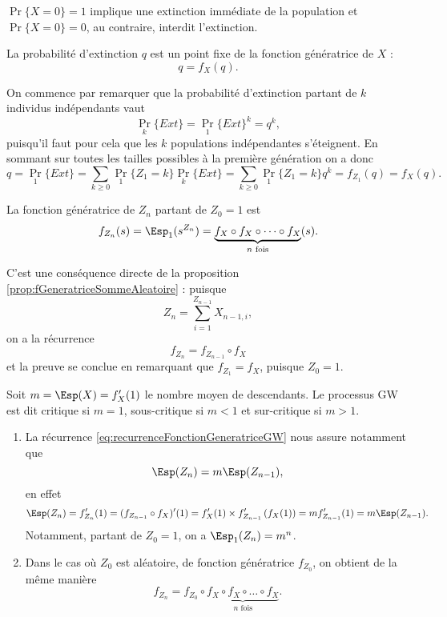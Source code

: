 \remark
$\Pr\{X = 0\} = 1$ implique une extinction immédiate de la population et $\Pr\{X = 0\} = 0$, au contraire, interdit l'extinction.

\begin{proposition}
  La probabilité d'extinction $q$ est un point fixe de la fonction génératrice de $X$ :
  $$
  q = f_X(q).
  $$
\end{proposition}

\proof
On commence par remarquer que la probabilité d'extinction partant de $k$ individus indépendants vaut
$$
\Pr_k\{Ext\} = \Pr_1\{Ext\}^k = q^k,
$$
puisqu'il faut pour cela que les $k$ populations indépendantes s'éteignent. En sommant sur toutes les tailles possibles à la première génération on a donc
$$
q 
= \Pr_1\{Ext\} 
= \sum_{k \geq 0} \Pr_1\{Z_1 = k\} \Pr_k\{Ext\}
= \sum_{k \geq 0} \Pr_1\{Z_1 = k\} q^k
= f_{Z_1}(q)
= f_X(q).
$$

\begin{proposition} \label{prop:fonctionGeneratriceZn}
  La fonction génératrice de $Z_n$ partant de $Z_0 = 1$ est
  $$
  f_{Z_n}(s) = \Esp_1(s^{Z_n}) = \underset{n \text{ fois}}{\underbrace{f_X \circ f_X \circ \dots \circ f_X}}(s).
  $$
\end{proposition}

\proof 
C'est une conséquence directe de la proposition \ref{prop:fGeneratriceSommeAleatoire} : puisque
$$
Z_n = \sum_{i=1}^{Z_{n-1}} X_{n-1, i},
$$
on a la récurrence 
\begin{equation} \label{eq:recurrenceFonctionGeneratriceGW}
f_{Z_n} = f_{Z_{n-1}} \circ f_X
\end{equation}
et la preuve se conclue en remarquant que $f_{Z_1} = f_X$, puisque $Z_0 = 1$.
\eproof

\begin{definition}
  Soit $m = \Esp(X) = f'_X(1)$ le nombre moyen de descendants. Le processus GW est dit critique si $m=1$, sous-critique si $m < 1$ et sur-critique si $m > 1$.
\end{definition}

\remarks
\begin{enumerate}
  \item La récurrence \eqref{eq:recurrenceFonctionGeneratriceGW} nous assure notamment que
  $$
  \Esp(Z_n) = m \Esp(Z_{n-1}),
  $$
  en effet
  \begin{align*}
    \Esp(Z_n) 
    = f'_{Z_n}(1) = (f_{Z_{n-1}} \circ f_X)'(1) 
    = f'_X(1) \times f'_{Z_{n-1}}\left(f_X(1)\right) 
    = m f'_{Z_{n-1}}(1) = m \Esp(Z_{n-1}).
  \end{align*}
  Notamment, partant de $Z_0 = 1$, on a $\Esp_1(Z_n) = m^n$.
  \item Dans le cas où $Z_0$ est aléatoire, de fonction génératrice $f_{Z_0}$, on obtient de la même manière
  $$
  f_{Z_n} =  f_{Z_0} \circ \underset{n \text{ fois}}{\underbrace{f_X \circ f_X \circ \dots \circ f_X}}.
  $$
\end{enumerate}

